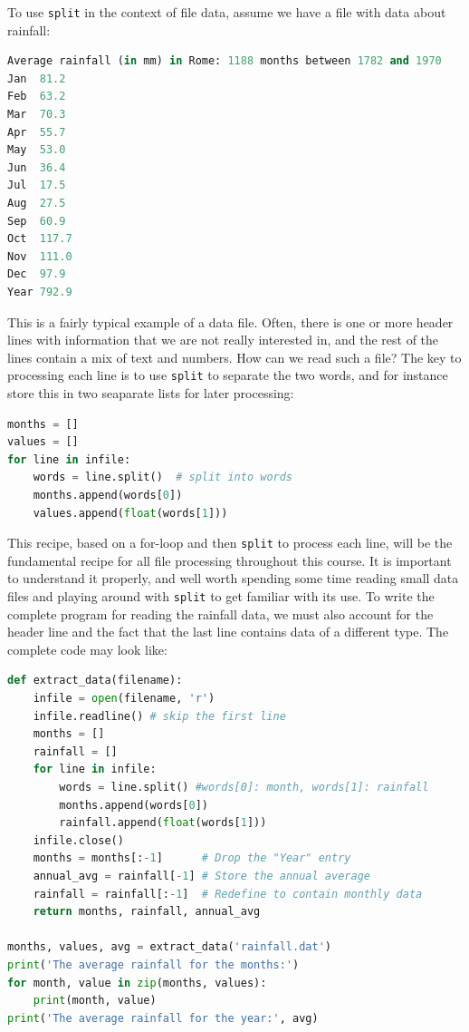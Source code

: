 \documentclass[graybox,envcountchap,sectrefs,final]{svmonodo}
\begin{document}
To use \texttt{split} in the context of file data, assume we have a file with data about rainfall:
\begin{lstlisting}[language=Python,style=blue1]
Average rainfall (in mm) in Rome: 1188 months between 1782 and 1970
Jan  81.2
Feb  63.2
Mar  70.3
Apr  55.7
May  53.0
Jun  36.4
Jul  17.5
Aug  27.5
Sep  60.9
Oct  117.7
Nov  111.0
Dec  97.9
Year 792.9
\end{lstlisting}
This is a fairly typical example of a data file. Often, there is one or more header lines with information
that we are not really interested in, and the rest of the lines contain a mix of text and numbers. How can we read such a file?
The key to processing each line is to use \texttt{split} to separate the two words, and for instance store this in
two seaparate lists for later processing:
\begin{lstlisting}[language=Python,style=blue1]
months = []
values = []
for line in infile:
    words = line.split()  # split into words
    months.append(words[0])
    values.append(float(words[1]))
\end{lstlisting}
This recipe, based on a for-loop and then \texttt{split} to process each line, will be the fundamental recipe
for all file processing throughout this course. It is important to understand it properly, and well worth spending some
time reading small data files and playing around with \texttt{split} to get familiar with its use.
To write the complete program for reading the rainfall data, we must also account for the header line and the fact that
the last line contains data of a different type. The complete code may look like:
\begin{lstlisting}[language=Python,style=blue1bar]
def extract_data(filename):
    infile = open(filename, 'r')
    infile.readline() # skip the first line
    months = []
    rainfall = []
    for line in infile:
        words = line.split() #words[0]: month, words[1]: rainfall
        months.append(words[0])
        rainfall.append(float(words[1]))
    infile.close()
    months = months[:-1]      # Drop the "Year" entry
    annual_avg = rainfall[-1] # Store the annual average
    rainfall = rainfall[:-1]  # Redefine to contain monthly data
    return months, rainfall, annual_avg

months, values, avg = extract_data('rainfall.dat')
print('The average rainfall for the months:')
for month, value in zip(months, values):
    print(month, value)
print('The average rainfall for the year:', avg)
\end{lstlisting}
\end{document}
